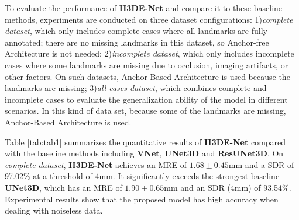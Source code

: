 To evaluate the performance of \textbf{H3DE-Net} and compare it to these baseline methods, experiments are conducted on three dataset configurations: 1)\textit{complete dataset}, which only includes complete cases where all landmarks are fully annotated; there are no missing landmarks in this dataset, so Anchor-free Architecture is not needed; 2)\textit{incomplete dataset}, which only includes incomplete cases where some landmarks are missing due to occlusion, imaging artifacts, or other factors. On such datasets, Anchor-Based Architecture is used because the landmarks are missing; 3)\textit{all cases dataset}, which combines complete and incomplete cases to evaluate the generalization ability of the model in different scenarios. In this kind of data set, because some of the landmarks are missing, Anchor-Based Architecture is used.

Table \ref{tab:tab1} summarizes the quantitative results of \textbf{H3DE-Net} compared with the baseline methods including \textbf{VNet}, \textbf{UNet3D} and \textbf{ResUNet3D}. On \textit{complete dataset}, \textbf{H3DE-Net} achieves an MRE of $1.68 \pm 0.45$mm and a SDR of 97.02\% at a threshold of 4mm. It significantly exceeds the strongest baseline \textbf{UNet3D}, which has an MRE of $1.90 \pm 0.65$mm and an SDR (4mm) of 93.54\%. Experimental results show that the proposed model has high accuracy when dealing with noiseless data.


